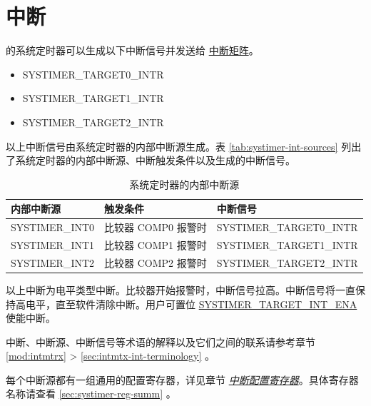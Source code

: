 \documentclass[main\_\_CN.tex]{subfiles}
\begin{document}
\section{中断}


\chipname{} 的系统定时器可以生成以下中断信号并发送给 \hyperref[mod:intmtrx]{中断矩阵}。

    \begin{itemize}
        \item SYSTIMER\_TARGET0\_INTR
        \item SYSTIMER\_TARGET1\_INTR
        \item SYSTIMER\_TARGET2\_INTR
    \end{itemize}

以上中断信号由系统定时器的内部中断源生成。表 \ref{tab:systimer-int-sources} 列出了系统定时器的内部中断源、中断触发条件以及生成的中断信号。

\begin{longtable}{ | L{3cm} | L{5cm} | L{7.5cm} | }
\caption{系统定时器的内部中断源} \label{tab:systimer-int-sources}
\\ \hline
{}
\textbf{内部中断源} & \textbf{触发条件}  &  \textbf{中断信号}\\ \hline
\label{int:SYSTIMERINT0}SYSTIMER\_INT0 &
比较器 COMP0 报警时 & SYSTIMER\_TARGET0\_INTR  \\ \hline
\label{int:SYSTIMERINT1}SYSTIMER\_INT1 &
比较器 COMP1 报警时 & SYSTIMER\_TARGET1\_INTR  \\ \hline
\label{int:SYSTIMERINT2}SYSTIMER\_INT2 &
比较器 COMP2 报警时 & SYSTIMER\_TARGET2\_INTR  \\ \hline
\end{longtable}

以上中断为电平类型中断。比较器开始报警时，中断信号拉高。中断信号将一直保持高电平，直至软件清除中断。用户可置位 \hyperref[fielddesc:SYSTIMERTARGET0INTENA]{SYSTIMER\_TARGET\_INT\_ENA} 使能中断。

\begin{tiplisting}
中断、中断源、中断信号等术语的解释以及它们之间的联系请参考章节 \ref{mod:intmtrx} \textit{} > \ref{sec:intmtx-int-terminology} \textit{}。
\end{tiplisting}

每个中断源都有一组通用的配置寄存器，详见章节 \hyperref[interrupt-config-registers]{\textit{中断配置寄存器}}。具体寄存器名称请查看 \ref{sec:systimer-reg-summ} \textit{}。
\end{document}
